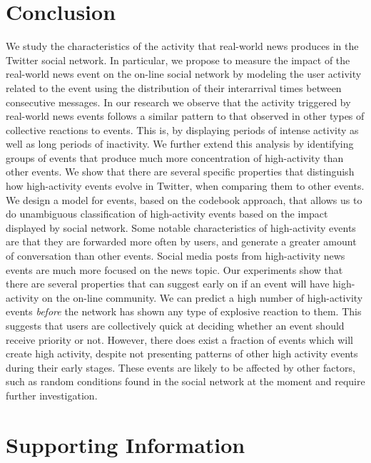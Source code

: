 \documentclass[10pt,letterpaper]{article}
\begin{document}
\section*{Conclusion}

We study the characteristics of the activity that real-world news produces
in the Twitter social network. In particular, we propose to measure the impact of the
real-world news event on the on-line social network by modeling the user
activity related to the event using the distribution of their
interarrival times between consecutive messages. In our research we observe
that the activity triggered by real-world news events follows a similar
pattern to that observed in other types of collective reactions to events.
This is, by displaying periods of intense activity as well as long periods of
inactivity. We further extend this analysis by identifying groups of events
that produce much more concentration of high-activity than other events. 
We show that there are several specific properties that distinguish how
high-activity events evolve in Twitter, when comparing them to other
events. We design a model for events, based on the codebook approach, that allows us to do
unambiguous classification of high-activity events based on the impact
displayed by social network. %
Some notable
characteristics of high-activity events are that they are forwarded more
often by users, and generate a greater amount of conversation than
other events.  Social media posts from high-activity news events are
much more focused on the news topic. Our experiments show that there
are several properties that can suggest early on if an event will have
high-activity on the on-line community.  We can predict a high number of
high-activity events {\em before} the network has shown any type of
explosive reaction to them. %
This suggests that users are collectively quick at deciding whether an
event should receive priority or not.  However, there does exist a fraction of
events which will create high activity, despite not presenting
patterns of other high activity events during their early stages.  These
events are likely to be affected by other factors, such as random
conditions found in the social network at the moment and require
further investigation.

\section*{Supporting Information}
\end{document}
